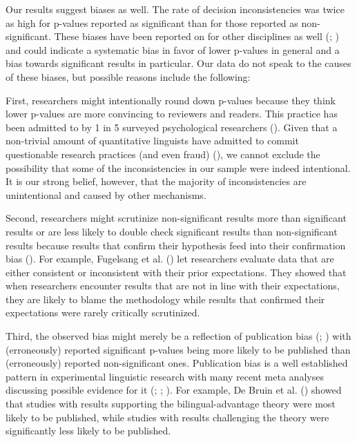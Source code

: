 \documentclass[
  doc,
  longtable,
  nolmodern,
  notxfonts,
  notimes,
  colorlinks=true,linkcolor=blue,citecolor=blue,urlcolor=blue]{apa7}
\begin{document}
Our results suggest biases as well. The rate of decision inconsistencies
was twice as high for p-values reported as significant than for those
reported as non-significant. These biases have been reported on for
other disciplines as well (; ) and could indicate a systematic bias in favor of lower p-values
in general and a bias towards significant results in particular. Our
data do not speak to the causes of these biases, but possible reasons
include the following:

First, researchers might intentionally round down p-values because they
think lower p-values are more convincing to reviewers and readers. This
practice has been admitted to by 1 in 5 surveyed psychological
researchers (). Given
that a non-trivial amount of quantitative linguists have admitted to
commit questionable research practices (and even fraud)
(), we cannot
exclude the possibility that some of the inconsistencies in our sample
were indeed intentional. It is our strong belief, however, that the
majority of inconsistencies are unintentional and caused by other
mechanisms.

Second, researchers might scrutinize non-significant results more than
significant results or are less likely to double check significant
results than non-significant results because results that confirm their
hypothesis feed into their confirmation bias
(). For
example, Fugelsang et al. () let
researchers evaluate data that are either consistent or inconsistent
with their prior expectations. They showed that when researchers
encounter results that are not in line with their expectations, they are
likely to blame the methodology while results that confirmed their
expectations were rarely critically scrutinized.

Third, the observed bias might merely be a reflection of publication
bias (;
) with
(erroneously) reported significant p-values being more likely to be
published than (erroneously) reported non-significant ones. Publication
bias is a well established pattern in experimental linguistic research
with many recent meta analyses discussing possible evidence for it
(;
;
). For example, De Bruin et
al. () showed that studies with
results supporting the bilingual-advantage theory were most likely to be
published, while studies with results challenging the theory were
significantly less likely to be published.
\end{document}
